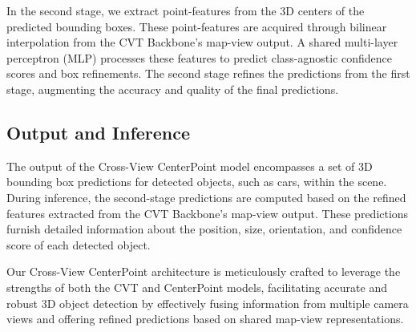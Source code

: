 \documentclass[times, report, parskip, openbib, twocolumn]{article}
\begin{document}
In the second stage, we extract point-features from the 3D centers of the predicted bounding boxes. These point-features are acquired through bilinear interpolation from the CVT Backbone's map-view output. A shared multi-layer perceptron (MLP) processes these features to predict class-agnostic confidence scores and box refinements. The second stage refines the predictions from the first stage, augmenting the accuracy and quality of the final predictions.

\subsection{Output and Inference}

The output of the Cross-View CenterPoint model encompasses a set of 3D bounding box predictions for detected objects, such as cars, within the scene. During inference, the second-stage predictions are computed based on the refined features extracted from the CVT Backbone's map-view output. These predictions furnish detailed information about the position, size, orientation, and confidence score of each detected object.

Our Cross-View CenterPoint architecture is meticulously crafted to leverage the strengths of both the CVT and CenterPoint models, facilitating accurate and robust 3D object detection by effectively fusing information from multiple camera views and offering refined predictions based on shared map-view representations.

\printbibliography
\end{document}
